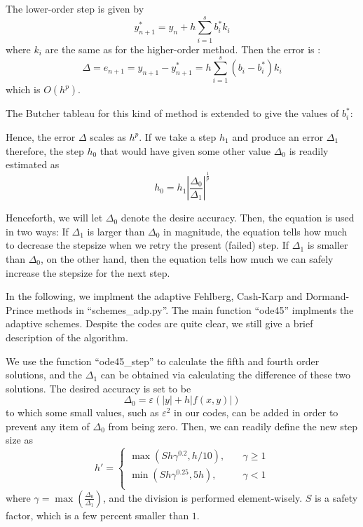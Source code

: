 \documentclass[conference,onecolumn,12pt]{IEEEtran}
\begin{document}
The lower-order step is given by 
$$ y^*_{n+1} = y_n + h\sum_{i=1}^s b^*_i k_i$$
where $k_i$ are the same as for the higher-order method. Then the error is :
$$ \Delta = e_{n+1} = y_{n+1} - y^*_{n+1} = h\sum_{i=1}^s (b_i - b^*_i) k_i$$
which is $O(h^p)$.

The Butcher tableau for this kind of method is extended to give the values of $b^*_i$:

Hence, the error $\Delta$ scales as $h^p$. If we take a step $h_1$ and produce an error $\Delta_1$ therefore, the step $h_0$ that would have given some other value $\Delta_0$ is readily estimated as
\begin{equation}
    h_0 = h_1\left|\frac{\Delta_0}{\Delta_1}\right|^{\frac{1}{p}}
\end{equation}

Henceforth, we will let $\Delta_0$ denote the desire accuracy.
Then, the equation is used in two ways: If $\Delta_1$ is larger than $\Delta_0$ in magnitude, the equation tells how much to decrease the
stepsize when we retry the present (failed) step. If $\Delta_1$ is
smaller than $\Delta_0$, on the other hand, then the equation tells
how much we can safely increase the stepsize for the next step.

In the following, we implment the adaptive Fehlberg, Cash-Karp and Dormand-Prince methods in ``schemes\_adp.py''. The main function ``ode45'' implments the adaptive schemes. Despite the codes are quite clear, we still give a brief description of the algorithm.

We use the function ``ode45\_step'' to calculate the fifth and fourth order solutions, and the $\Delta_1$ can be obtained via calculating the difference of these two solutions. The desired accuracy is set to be
\begin{equation}
    \Delta_0 = \varepsilon (|y|+h|f(x,y)|)
\end{equation}
to which some small values, such as $\varepsilon^2$ in our codes, can be added in order to prevent any item of $\Delta_0$ from being zero. Then, we can readily define the new step size as 
\begin{equation}
    h'=\begin{cases}
        \max(Sh \gamma^{0.2},h/10),&\quad \gamma\geq 1\\
        \min(Sh \gamma^{0.25}, 5h), &\quad \gamma<1 \\
    \end{cases}
\end{equation}
where $\gamma=\max\left(\frac{\Delta_0}{\Delta_1}\right)$, and the division is performed element-wisely. $S$ is a safety factor, which is a few percent smaller than $1$. 
\end{document}
